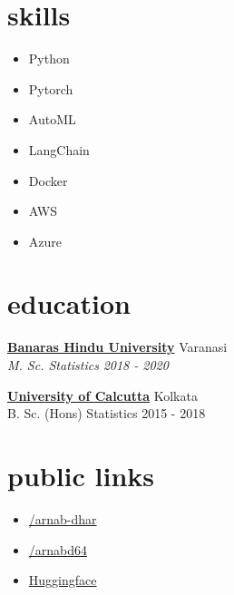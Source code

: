 \documentclass[12pt]{article}
\newcommand{\entry}[4]{{{\textbf{#1}}} \hfill #3 \\ #2 \hfill #4}
\begin{document}
\begin{paracol}{2}
\section{skills}
\begin{itemize}[itemsep=1pt,label={\faCode}]
  \item Python
  \item Pytorch
  \item AutoML
  \item LangChain
  \item Docker
  \item AWS
  \item Azure
\end{itemize}


\switchcolumn
\section{education}

\entry{\href{https://www.bhu.ac.in/Site/Home/1_2_16_Main-Site}{Banaras Hindu University}}{\emph{M. Sc. Statistics}}{Varanasi}{\emph{2018 - 2020}}

\medskip

\entry{\href{https://caluniv.ac.in/}{University of Calcutta}}{B. Sc. (Hons) Statistics}{Kolkata}{2015 - 2018}

\switchcolumn
\section{public links}

\begin{itemize}[itemsep=1pt]
  \item[\faLinkedin] \href{https://www.linkedin.com/in/arnab-dhar}{/arnab-dhar}
  \item[\faGithub] \href{https://www.github.com/arnabd64}{/arnabd64} 
  \item[\faLink] \href{https://hf.co/arnabdhar}{Huggingface} 
\end{itemize}


\end{paracol}
\end{document}
